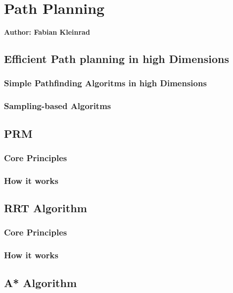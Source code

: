 \chapter{Path Planning}

\textbf{Author: Fabian Kleinrad} 

\section{Efficient Path planning in high Dimensions}

\subsection{Simple Pathfinding Algoritms in high Dimensions}

\subsection{Sampling-based Algoritms}

\section{PRM}

\subsection{Core Principles}

\subsection{How it works}

\section{RRT Algorithm}

\subsection{Core Principles}

\subsection{How it works}

\section{A* Algorithm}

